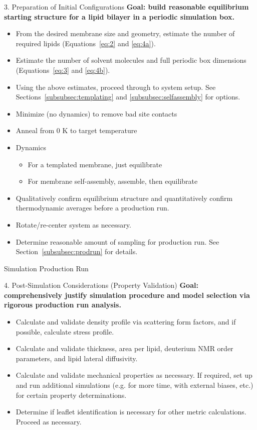 \documentclass[9pt,bestpractices]{livecoms}
\begin{document}
\begin{Checklists*}[p!]
\begin{checklist}{3. Preparation of Initial Configurations}
\textbf{Goal: build reasonable equilibrium starting structure for a lipid bilayer in a periodic simulation box.}
\begin{itemize}
\item From the desired membrane size and geometry, estimate the number of required lipids (Equations~\ref{eq:2} and \ref{eq:4a}).
\item Estimate the number of solvent molecules and full periodic box dimensions (Equations~\ref{eq:3} and \ref{eq:4b}).
\item Using the above estimates, proceed through to system setup. See Sections~\ref{subsubsec:templating} and \ref{subsubsec:selfassembly} for options.
\item Minimize (no dynamics) to remove bad site contacts
\item Anneal from 0 K to target temperature
\item Dynamics
	\begin{itemize}
	\item For a templated membrane, just equilibrate
	\item For membrane self-assembly, assemble, then equilibrate
	\end{itemize}
\item Qualitatively confirm equilibrium structure and quantitatively confirm thermodynamic averages before a production run.
\item Rotate/re-center system as necessary.
\item Determine reasonable amount of sampling for production run. See Section~\ref{subsubsec:prodrun} for details.
\end{itemize}
\end{checklist}

\begin{checklist}{Simulation Production Run}
\end{checklist}

\begin{checklist}{4. Post-Simulation Considerations (Property Validation)}
\textbf{Goal: comprehensively justify simulation procedure and model selection via rigorous production run analysis.}
\begin{itemize}
\item Calculate and validate density profile via scattering form factors, and if possible, calculate stress profile.
\item Calculate and validate thickness, area per lipid, deuterium NMR order parameters, and lipid lateral diffusivity.
\item Calculate and validate mechanical properties as necessary. If required, set up and run additional simulations (e.g. for more time, with external biases, etc.) for certain property determinations.
\item Determine if leaflet identification is necessary for other metric calculations. Proceed as necessary.
\end{itemize}
\end{checklist}

\end{Checklists*}
\end{document}
